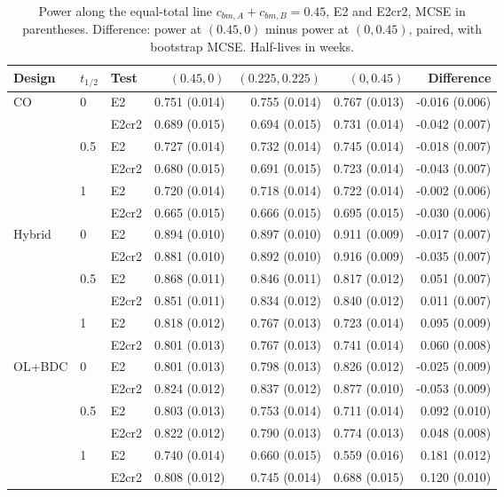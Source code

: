 \documentclass[
  11pt,
]{article}
\begin{document}
\begin{table}[H]
\small\centering
\caption{Power along the equal-total line $c_{bm,A} + c_{bm,B} = 0.45$, E2 and E2cr2, MCSE in parentheses. Difference: power at $(0.45, 0)$ minus power at $(0, 0.45)$, paired, with bootstrap MCSE. Half-lives in weeks.}
\label{tab:eqsum}
\begin{tabular}{lllrrrr}
\toprule
Design & $t_{1/2}$ & Test & $(0.45, 0)$ & $(0.225, 0.225)$ & $(0, 0.45)$ & Difference \\
\midrule
CO & 0 & E2 & 0.751 (0.014) & 0.755 (0.014) & 0.767 (0.013) & -0.016 (0.006) \\
 &  & E2cr2 & 0.689 (0.015) & 0.694 (0.015) & 0.731 (0.014) & -0.042 (0.007) \\
 & 0.5 & E2 & 0.727 (0.014) & 0.732 (0.014) & 0.745 (0.014) & -0.018 (0.007) \\
 &  & E2cr2 & 0.680 (0.015) & 0.691 (0.015) & 0.723 (0.014) & -0.043 (0.007) \\
 & 1 & E2 & 0.720 (0.014) & 0.718 (0.014) & 0.722 (0.014) & -0.002 (0.006) \\
 &  & E2cr2 & 0.665 (0.015) & 0.666 (0.015) & 0.695 (0.015) & -0.030 (0.006) \\
Hybrid & 0 & E2 & 0.894 (0.010) & 0.897 (0.010) & 0.911 (0.009) & -0.017 (0.007) \\
 &  & E2cr2 & 0.881 (0.010) & 0.892 (0.010) & 0.916 (0.009) & -0.035 (0.007) \\
 & 0.5 & E2 & 0.868 (0.011) & 0.846 (0.011) & 0.817 (0.012) & 0.051 (0.007) \\
 &  & E2cr2 & 0.851 (0.011) & 0.834 (0.012) & 0.840 (0.012) & 0.011 (0.007) \\
 & 1 & E2 & 0.818 (0.012) & 0.767 (0.013) & 0.723 (0.014) & 0.095 (0.009) \\
 &  & E2cr2 & 0.801 (0.013) & 0.767 (0.013) & 0.741 (0.014) & 0.060 (0.008) \\
OL+BDC & 0 & E2 & 0.801 (0.013) & 0.798 (0.013) & 0.826 (0.012) & -0.025 (0.009) \\
 &  & E2cr2 & 0.824 (0.012) & 0.837 (0.012) & 0.877 (0.010) & -0.053 (0.009) \\
 & 0.5 & E2 & 0.803 (0.013) & 0.753 (0.014) & 0.711 (0.014) & 0.092 (0.010) \\
 &  & E2cr2 & 0.822 (0.012) & 0.790 (0.013) & 0.774 (0.013) & 0.048 (0.008) \\
 & 1 & E2 & 0.740 (0.014) & 0.660 (0.015) & 0.559 (0.016) & 0.181 (0.012) \\
 &  & E2cr2 & 0.808 (0.012) & 0.745 (0.014) & 0.688 (0.015) & 0.120 (0.010) \\
\bottomrule
\end{tabular}
\end{table}
\end{document}
